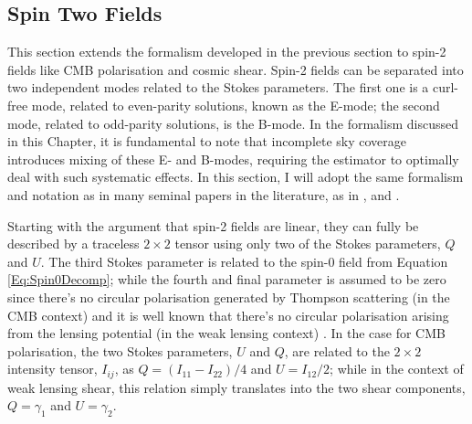\subsection{Spin Two Fields}\label{Sec:BPL:Spin-2_Form}
This section extends the formalism developed in the previous section to spin-2 fields like CMB polarisation and cosmic shear. Spin-2 fields can be separated into two independent modes related to the Stokes parameters. The first one is a curl-free mode, related to even-parity solutions, known as the E-mode; the second mode, related to odd-parity solutions, is the B-mode. In the formalism discussed in this Chapter, it is fundamental to note that incomplete sky coverage introduces mixing of these E- and B-modes, requiring the estimator to optimally deal with such systematic effects. In this section, I will adopt the same formalism and notation as in many seminal papers in the literature, as in \cite{Seljak1997}, \cite{Taylor2008} and \cite{Hikage2011}.

\qquad Starting with the argument that spin-2 fields are linear, they can fully be described by a traceless $2 \times 2$ tensor using only two of the Stokes parameters, $Q$ and $U$. The third Stokes parameter is related to the spin-0 field from Equation \eqref{Eq:Spin0Decomp}; while the fourth and final parameter is assumed to be zero since there's no circular polarisation generated by Thompson scattering (in the CMB context) and it is well known that there's no circular polarisation arising from the lensing potential (in the weak lensing context) . In the case for CMB polarisation, the two Stokes parameters, $U$ and $Q$, are related to the $2\times 2$ intensity tensor, $I_{ij}$, as $Q=(I_{11}-I_{22})/4$ and $U=I_{12}/2$; while in the context of weak lensing shear, this relation simply translates into the two shear components, $Q=\gamma_1$ and $U=\gamma_2$.

